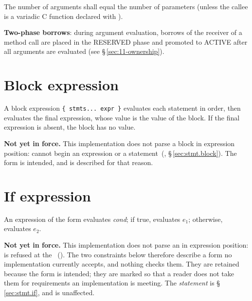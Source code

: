 \begin{constraint}
  The number of arguments shall equal the number of parameters (unless the
  callee is a variadic C function declared with ).
\end{constraint}

\pnum
\textbf{Two-phase borrows}: during argument evaluation, borrows of the
receiver of a method call are placed in the RESERVED phase and promoted to
ACTIVE after all arguments are evaluated
(see \S\,\ref{sec:11-ownership}).

\section{Block expression}
\label{sec:expr.block}

\pnum
A block expression \texttt{\{ stmts... expr \}} evaluates each statement
in order, then evaluates the final expression, whose value is the value of
the block.  If the final expression is absent, the block has no value.

\begin{note}
  \textbf{Not yet in force.}  This implementation does not parse a block in expression
  position: \lain{\{} cannot begin an expression or a statement~(,
  \S\,\ref{sec:stmt.block}).  The form is intended, and is described for that reason.
\end{note}

\section{If expression}
\label{sec:expr.if}

\pnum
An  expression of the form
 evaluates \textit{cond}; if true,
evaluates $e_1$; otherwise, evaluates $e_2$.

\begin{note}
  \textbf{Not yet in force.}  This implementation does not parse an  in
  expression position:  is refused at the
  ~().  The two constraints below therefore describe a form no
  implementation currently accepts, and nothing checks them.  They are retained because the
  form is intended; they are marked so that a reader does not take them for requirements an
  implementation is meeting.  The  \emph{statement} is
  \S\,\ref{sec:stmt.if}, and is unaffected.
\end{note}

